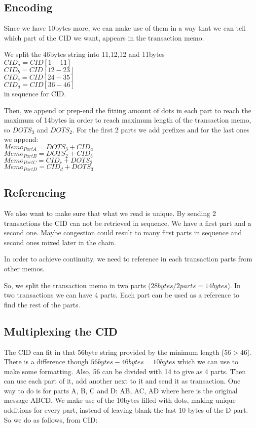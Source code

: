 \documentclass[10pt,a4paper,twocolumn]{paper}
\begin{document}
	\subsection{Encoding}\label{encoding}
	Since we have 10bytes more, we can make use of them in a way that we can tell which part of the CID we want, appears in the transaction memo.
	
	We split the 46bytes string into 11,12,12 and 11bytes\\
	$ CID_{a} = CID[1-11] $\\
	$ CID_{b} = CID[12-23] $\\
	$ CID_{c} = CID[24-35] $\\
	$ CID_{d} = CID[36-46] $\\in sequence for CID.
	
	Then, we append or prep-end the fitting amount of dots in each part to reach the maximum of 14bytes in order to reach maximum length of the transaction memo, so $DOTS_{3}$ and $DOTS_{2}$. For the first 2 parts we add prefixes and for the last ones we append:\\
		$ Memo_{PartA} = DOTS_{3} + CID_{a} $\\
		$ Memo_{PartB} = DOTS_{2} + CID_{b} $\\
		$ Memo_{PartC} = CID_{c} + DOTS_{2} $\\
		$ Memo_{PartD} = CID_{d} + DOTS_{3} $

	\subsection{Referencing}\label{referencing}
	We also want to make sure that what we read is unique. By sending 2 transactions the CID can not be retrieved in sequence. We have a first part and a second one. Maybe congestion could result to many first parts in sequence and second ones mixed later in the chain.
	
	In order to achieve continuity, we need to reference in each transaction parts from other memos.
	
	
	So, we split the transaction memo in two parts ($ 28bytes/2parts=14bytes $). In two transactions we can have 4 parts. Each part can be used as a reference to find the rest of the parts.
	
	\subsection{Multiplexing the CID}\label{multiplexing}
	The CID can fit in that 56byte string provided by the minimum length ($ 56>46 $). There is a difference though $ 56bytes-46bytes=10bytes $ which we can use to make some formatting. Also, 56 can be divided with 14 to give as 4 parts. Then can use each part of it, add another next to it and send it as transaction. One way to do is for parts A, B, C and D: AB, AC, AD where here is the original message ABCD. We make use of the 10bytes filled with dots, making unique additions for every part, instead of leaving blank the last 10 bytes of the D part. So we do as follows, from CID:
\end{document}

